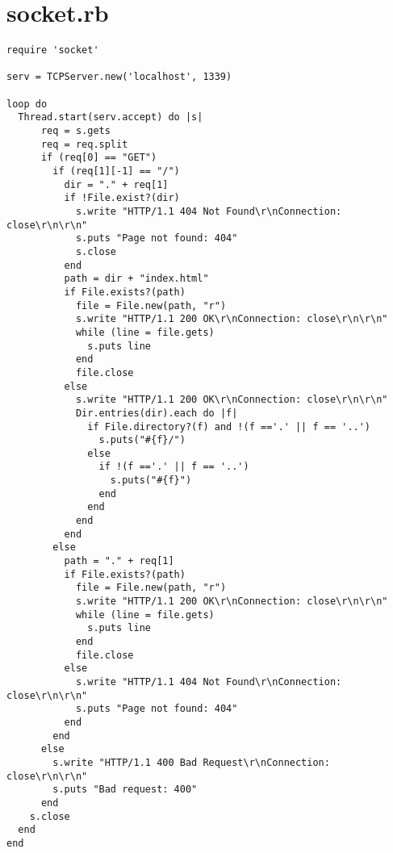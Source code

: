 \documentclass{acm_proc_article-sp}
\begin{document}
\newpage
$ $
\newpage
\appendix
\section{socket.rb}\label{1}
\begin{verbatim}
require 'socket'

serv = TCPServer.new('localhost', 1339)

loop do
  Thread.start(serv.accept) do |s|
      req = s.gets
      req = req.split
      if (req[0] == "GET")
        if (req[1][-1] == "/")
          dir = "." + req[1]
          if !File.exist?(dir)
            s.write "HTTP/1.1 404 Not Found\r\nConnection: close\r\n\r\n"
            s.puts "Page not found: 404"
            s.close
          end
          path = dir + "index.html"
          if File.exists?(path)
            file = File.new(path, "r")
            s.write "HTTP/1.1 200 OK\r\nConnection: close\r\n\r\n"
            while (line = file.gets)
              s.puts line
            end
            file.close
          else
            s.write "HTTP/1.1 200 OK\r\nConnection: close\r\n\r\n"
            Dir.entries(dir).each do |f|  
              if File.directory?(f) and !(f =='.' || f == '..')
                s.puts("#{f}/")
              else 
                if !(f =='.' || f == '..')
                  s.puts("#{f}")
                end
              end
            end
          end
        else
          path = "." + req[1]
          if File.exists?(path)
            file = File.new(path, "r")
            s.write "HTTP/1.1 200 OK\r\nConnection: close\r\n\r\n"
            while (line = file.gets)
              s.puts line
            end
            file.close
          else
            s.write "HTTP/1.1 404 Not Found\r\nConnection: close\r\n\r\n"
            s.puts "Page not found: 404"
          end
        end
      else
        s.write "HTTP/1.1 400 Bad Request\r\nConnection: close\r\n\r\n"
        s.puts "Bad request: 400"
      end
    s.close
  end
end
\end{verbatim}
\end{document}
